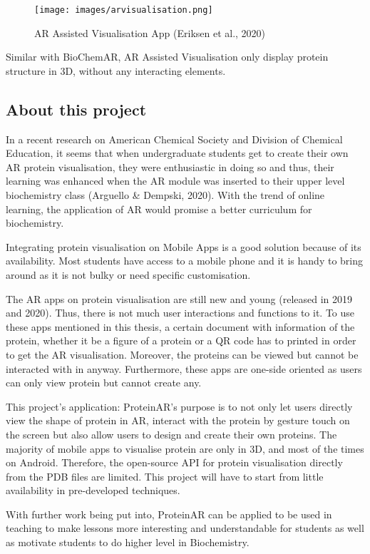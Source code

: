 \begin{figure}[!htbp]
	\centering
	\texttt{[image: images/arvisualisation.png]}
	\caption{AR Assisted Visualisation App (Eriksen et al., 2020)}
	\label{arvisualisation}
\end{figure}

Similar with BioChemAR, AR Assisted Visualisation only display protein structure in 3D, without any interacting elements. 

\subsection{About this project}
In a recent research on American Chemical Society and Division of Chemical Education, it seems that when undergraduate students get to create their own AR protein visualisation, they were enthusiastic in doing so and thus, their learning was enhanced when the AR module was inserted to their upper level biochemistry class (Arguello \& Dempski, 2020). With the trend of online learning, the application of AR would promise a better curriculum for biochemistry.

Integrating protein visualisation on Mobile Apps is a good solution because of its availability. Most students have access to a mobile phone and it is handy  to bring around as it is not bulky or need specific customisation. 

The AR apps on protein visualisation are still new and young (released in 2019 and 2020). Thus, there is not much user interactions and functions to it. To use these apps mentioned in this thesis, a certain document with information of the protein, whether it be a figure of a protein or a QR code has to printed in order to get the AR visualisation. Moreover, the proteins can be viewed but cannot be interacted with in anyway. Furthermore, these apps are one-side oriented as users can only view protein but cannot create any. 

This project’s application: ProteinAR’s purpose is to not only let users directly view the shape of protein in AR, interact with the protein by gesture touch on the screen but also allow users to design and create their own proteins. 
The majority of mobile apps to visualise protein are only in 3D, and most of the times on Android. Therefore, the open-source API for protein visualisation directly from the PDB files are limited. This project will have to start from little availability in pre-developed techniques.

With further work being put into, ProteinAR can be applied to be used in teaching to make lessons more interesting and understandable for students as well as motivate students to do higher level in Biochemistry. 




